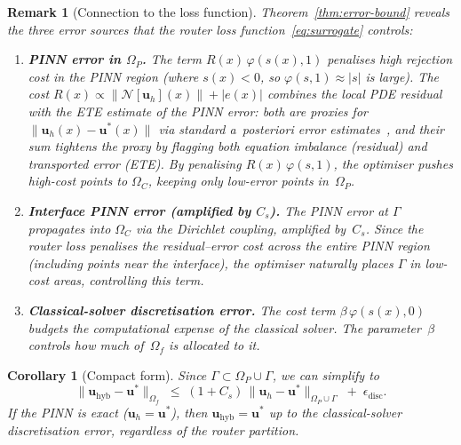 \documentclass[11pt]{article}
\newtheorem{corollary}[theorem]{Corollary}
\newtheorem{remark}[theorem]{Remark}
\newcommand{\Ncal}{\mathcal{N}}
\begin{document}
\begin{remark}[Connection to the loss function]\label{rem:loss-justification}
Theorem~\ref{thm:error-bound} reveals the three error sources that the router loss
function~\eqref{eq:surrogate} controls:

\begin{enumerate}
\item[\textbf{(I)}] \textbf{PINN error in $\Omega_P$.}  The term
  $R(x)\,\varphi(s(x), 1)$ penalises high rejection cost in the PINN region
  (where $s(x) < 0$, so $\varphi(s,1) \approx |s|$ is large).  The cost
  $R(x) \propto \|\Ncal[\mathbf{u}_h](x)\| + |e(x)|$ combines the local PDE
  residual with the ETE estimate of the PINN error: both are proxies for
  $\|\mathbf{u}_h(x) - \mathbf{u}^*(x)\|$ via standard a~posteriori error
  estimates~\cite{verfurth2013posteriori}, and their sum tightens the proxy by
  flagging both \emph{equation imbalance} (residual) and \emph{transported error}
  (ETE).  By penalising $R(x)\,\varphi(s,1)$, the optimiser pushes high-cost
  points to $\Omega_C$, keeping only low-error points in~$\Omega_P$.

\item[\textbf{(II)}] \textbf{Interface PINN error (amplified by $C_s$).}  The PINN
  error at $\Gamma$ propagates into $\Omega_C$ via the Dirichlet coupling,
  amplified by~$C_s$.  Since the router loss penalises the residual--error cost
  across the entire PINN region (including points near the interface), the
  optimiser naturally places $\Gamma$ in low-cost areas, controlling this term.

\item[\textbf{(III)}] \textbf{Classical-solver discretisation error.}  The cost term
  $\beta\,\varphi(s(x), 0)$ budgets the computational expense of the classical
  solver.  The parameter~$\beta$ controls how much of~$\Omega_f$ is allocated to
  it.
\end{enumerate}
\end{remark}

\begin{corollary}[Compact form]\label{cor:compact}
Since $\Gamma \subset \Omega_P \cup \Gamma$, we can simplify to
\begin{equation}\label{eq:compact-bound}
  \bigl\|\mathbf{u}_{\mathrm{hyb}} - \mathbf{u}^*\bigr\|_{\Omega_f}
  \;\le\; (1 + C_s)\,\bigl\|\mathbf{u}_h - \mathbf{u}^*\bigr\|_{\Omega_P \cup \Gamma}
  \;+\; \epsilon_{\mathrm{disc}}.
\end{equation}
If the PINN is exact ($\mathbf{u}_h = \mathbf{u}^*$), then
$\mathbf{u}_{\mathrm{hyb}} = \mathbf{u}^*$ up to the classical-solver
discretisation error, regardless of the router partition.
\end{corollary}
\end{document}
